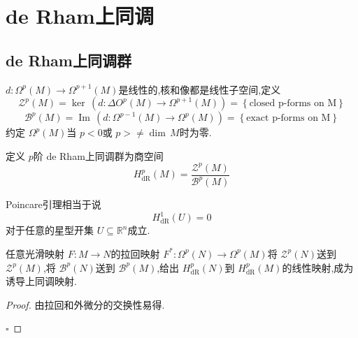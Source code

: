 \documentclass[../../几何与拓扑.tex]{subfiles}
\begin{document}
\ifSubfilesClassLoaded{
    \frontmatter

    \tableofcontents
    
    \mainmatter
}{}

\chapter{de Rham上同调}

\section{de Rham上同调群}
\begin{definition}
    \(  d: \Omega ^{p}\left( M \right)\to  \Omega ^{p+ 1}\left( M \right)    \)是线性的,核和像都是线性子空间,定义 \[
    \mathcal{Z}^{p}\left( M \right)=  \operatorname{ker}\,\left( d: \Delta O^{p}\left( M \right)\to  \Omega ^{p+ 1}\left( M \right)   \right)= \left\{ \text{closed p-forms on M} \right\} 
    \] \[
    \mathcal{B}^{p}\left( M \right)= \operatorname{Im}\,\left( d: \Omega ^{p-1}\left( M \right)\to  \Omega ^{p}\left( M \right)   \right)= \left\{ \text{exact p-forms on M} \right\}  
    \] 约定 \(   \Omega ^{p}\left( M \right)   \)当 \(  p<0  \)或 \(  p> \neq \operatorname{dim}\,M  \)时为零.   
\end{definition}


\begin{definition}
    定义 \(  p  \)阶 de Rham上同调群为商空间 \[
    H_{\mathrm{dR}}^{p}\left( M \right)= \frac{\mathcal{Z}^{p}\left( M \right)  }{ \mathcal{B}^{p}\left( M \right)   }
    \] 
\end{definition}

\begin{example}
    Poincare引理相当于说 \[
    H_{\mathrm{dR}}^{1}\left( U \right)= 0 
    \]对于任意的星型开集 \(  U  \subseteq \mathbb{R} ^{n}\)成立. 
\end{example}

\hspace*{\fill} 

\begin{proposition}
    任意光滑映射 \(  F:M\to N  \)的拉回映射 \(  F^{*}: \Omega ^{p}\left( N \right)\to  \Omega ^{p}\left( M \right)    \)将 \(  \mathcal{Z}^{p}\left( N \right)   \)送到 \(  \mathcal{Z}^{p}\left( M \right)   \),将 \(  \mathcal{B}^{p}\left( N \right)   \)送到 \(  \mathcal{B}^{p}\left( M \right)   \),给出 \(  H_{\mathrm{dR}}^{p}\left( N \right)   \)到 \(  H_{\mathrm{dR}}^{p}\left( M \right)   \)的线性映射,成为诱导上同调映射.

\end{proposition}
\begin{proof}
    由拉回和外微分的交换性易得.

    \hfill $\square$
\end{proof}
\end{document}
